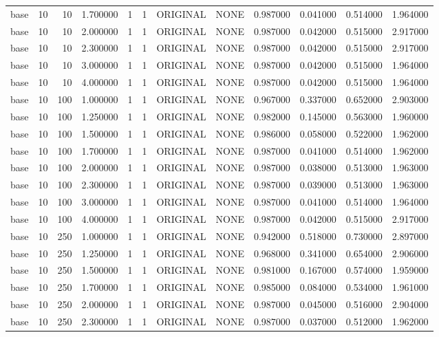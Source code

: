 \begin{tabular}{lrrrllllrrrr}
base & 10 & 10 & 1.700000 & 1 & 1 & ORIGINAL & NONE & 0.987000 & 0.041000 & 0.514000 & 1.964000 \\
base & 10 & 10 & 2.000000 & 1 & 1 & ORIGINAL & NONE & 0.987000 & 0.042000 & 0.515000 & 2.917000 \\
base & 10 & 10 & 2.300000 & 1 & 1 & ORIGINAL & NONE & 0.987000 & 0.042000 & 0.515000 & 2.917000 \\
base & 10 & 10 & 3.000000 & 1 & 1 & ORIGINAL & NONE & 0.987000 & 0.042000 & 0.515000 & 1.964000 \\
base & 10 & 10 & 4.000000 & 1 & 1 & ORIGINAL & NONE & 0.987000 & 0.042000 & 0.515000 & 1.964000 \\
base & 10 & 100 & 1.000000 & 1 & 1 & ORIGINAL & NONE & 0.967000 & 0.337000 & 0.652000 & 2.903000 \\
base & 10 & 100 & 1.250000 & 1 & 1 & ORIGINAL & NONE & 0.982000 & 0.145000 & 0.563000 & 1.960000 \\
base & 10 & 100 & 1.500000 & 1 & 1 & ORIGINAL & NONE & 0.986000 & 0.058000 & 0.522000 & 1.962000 \\
base & 10 & 100 & 1.700000 & 1 & 1 & ORIGINAL & NONE & 0.987000 & 0.041000 & 0.514000 & 1.962000 \\
base & 10 & 100 & 2.000000 & 1 & 1 & ORIGINAL & NONE & 0.987000 & 0.038000 & 0.513000 & 1.963000 \\
base & 10 & 100 & 2.300000 & 1 & 1 & ORIGINAL & NONE & 0.987000 & 0.039000 & 0.513000 & 1.963000 \\
base & 10 & 100 & 3.000000 & 1 & 1 & ORIGINAL & NONE & 0.987000 & 0.041000 & 0.514000 & 1.964000 \\
base & 10 & 100 & 4.000000 & 1 & 1 & ORIGINAL & NONE & 0.987000 & 0.042000 & 0.515000 & 2.917000 \\
base & 10 & 250 & 1.000000 & 1 & 1 & ORIGINAL & NONE & 0.942000 & 0.518000 & 0.730000 & 2.897000 \\
base & 10 & 250 & 1.250000 & 1 & 1 & ORIGINAL & NONE & 0.968000 & 0.341000 & 0.654000 & 2.906000 \\
base & 10 & 250 & 1.500000 & 1 & 1 & ORIGINAL & NONE & 0.981000 & 0.167000 & 0.574000 & 1.959000 \\
base & 10 & 250 & 1.700000 & 1 & 1 & ORIGINAL & NONE & 0.985000 & 0.084000 & 0.534000 & 1.961000 \\
base & 10 & 250 & 2.000000 & 1 & 1 & ORIGINAL & NONE & 0.987000 & 0.045000 & 0.516000 & 2.904000 \\
base & 10 & 250 & 2.300000 & 1 & 1 & ORIGINAL & NONE & 0.987000 & 0.037000 & 0.512000 & 1.962000 \\

\end{tabular}
